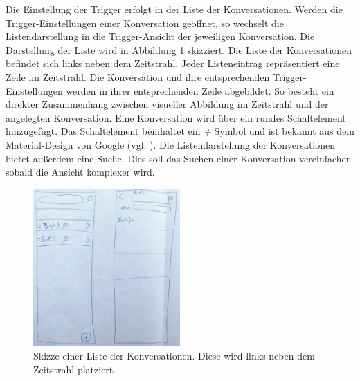Die Einstellung der Trigger erfolgt in der Liste der Konversationen. Werden die Trigger-Einstellungen einer Konversation geöffnet, so wechselt die Listendarstellung in die Trigger-Ansicht der jeweiligen Konversation. Die Darstellung der Liste wird in Abbildung \ref{liste} skizziert. Die Liste der Konversationen befindet sich links neben dem Zeitstrahl. Jeder Listeneintrag repräsentiert eine Zeile im Zeitstrahl. Die Konversation und ihre entsprechenden Trigger-Einstellungen werden in ihrer entsprechenden Zeile abgebildet. So besteht ein direkter Zusammenhang zwischen visueller Abbildung im Zeitstrahl und der angelegten Konversation. Eine Konversation wird über ein rundes Schaltelement hinzugefügt. Das Schaltelement beinhaltet ein \emph{+} Symbol und ist bekannt aus dem Material-Design von Google (vgl. \cite{Buttonsf61:online}). Die Listendarstellung der Konversationen bietet außerdem eine Suche. Dies soll das Suchen einer Konversation vereinfachen sobald die Ansicht komplexer wird. 


\begin{figure}[h]
\centering
\includegraphics[width=0.5\textwidth]{pictures/liste}
\caption{Skizze einer Liste der Konversationen. Diese wird links neben dem Zeitstrahl platziert.}
\label{liste}
\end{figure}

